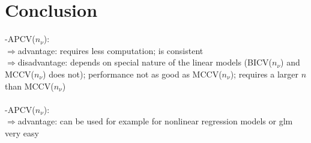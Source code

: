 \documentclass[Research_Module_ES.tex]{subfiles}
\begin{document}
\section{Conclusion}
-APCV($n_\nu$):\\ 
$\Rightarrow$advantage: requires less computation; is consistent\\
$\Rightarrow$disadvantage: depends on special nature of the linear models (BICV($n_\nu$) and MCCV($n_\nu$) does not); performance not as good as MCCV($n_\nu$); requires a larger $n$ than MCCV($n_\nu$)\\\\
-APCV($n_\nu$):\\
$\Rightarrow$advantage: can be used for example for nonlinear regression models or glm very easy\\
\end{document}
